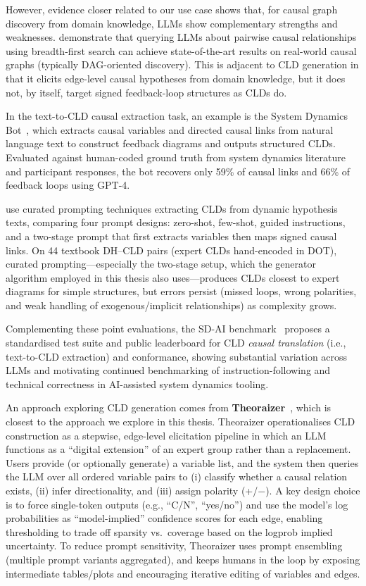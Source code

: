 However, evidence closer related to our use case shows that, for causal graph discovery from domain knowledge, LLMs show complementary strengths and weaknesses. \citet{jiralerspong2024efficientcausalgraphdiscovery} demonstrate that querying LLMs about pairwise causal relationships using breadth-first search can achieve state-of-the-art results on real-world causal graphs (typically DAG-oriented discovery). This is adjacent to CLD generation in that it elicits edge-level causal hypotheses from domain knowledge, but it does not, by itself, target signed feedback-loop structures as CLDs do.

In the text-to-CLD causal extraction task, an example is the System Dynamics Bot~\citep{hosseinichimeh2024textmapdynamicsbot}, which extracts causal variables and directed causal links from natural language text to construct feedback diagrams and outputs structured CLDs. Evaluated against human-coded ground truth from system dynamics literature and participant responses, the bot recovers only 59\% of causal links and 66\% of feedback loops using GPT-4.

\citet{liu2024leveraging} use curated prompting techniques extracting CLDs from dynamic hypothesis texts, comparing four prompt designs: zero-shot, few-shot, guided instructions, and a two-stage prompt that first extracts variables then maps signed causal links. On 44 textbook DH--CLD pairs (expert CLDs hand-encoded in DOT), curated prompting---especially the two-stage setup, which the generator algorithm employed in this thesis also uses---produces CLDs closest to expert diagrams for simple structures, but errors persist (missed loops, wrong polarities, and weak handling of exogenous/implicit relationships) as complexity grows.

Complementing these point evaluations, the SD-AI benchmark~\citep{schoenberg2025aibuildsdmodels} proposes a standardised test suite and public leaderboard for CLD \emph{causal translation} (i.e., text-to-CLD extraction) and conformance, showing substantial variation across LLMs and motivating continued benchmarking of instruction-following and technical correctness in AI-assisted system dynamics tooling.

An approach exploring CLD generation comes from \textbf{Theoraizer}~\citep{Waaijers2024theoraizer}, which is closest to the approach we explore in this thesis. Theoraizer operationalises CLD construction as a stepwise, edge-level elicitation pipeline in which an LLM functions as a ``digital extension'' of an expert group rather than a replacement. Users provide (or optionally generate) a variable list, and the system then queries the LLM over all ordered variable pairs to (i) classify whether a causal relation exists, (ii) infer directionality, and (iii) assign polarity (+/$-$). A key design choice is to force single-token outputs (e.g., ``C/N'', ``yes/no'') and use the model's log probabilities as ``model-implied'' confidence scores for each edge, enabling thresholding to trade off sparsity vs.\ coverage based on the logprob implied uncertainty. To reduce prompt sensitivity, Theoraizer uses prompt ensembling (multiple prompt variants aggregated), and keeps humans in the loop by exposing intermediate tables/plots and encouraging iterative editing of variables and edges.

